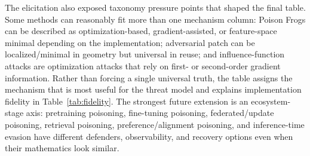 ﻿\documentclass[6p,10pt,times]{ieeeaccess}
\begin{document}
The elicitation also exposed taxonomy pressure points that shaped the final table. Some methods can reasonably fit more than one mechanism column: Poison Frogs can be described as optimization-based, gradient-assisted, or feature-space minimal depending on the implementation; adversarial patch can be localized/minimal in geometry but universal in reuse; and influence-function attacks are optimization attacks that rely on first- or second-order gradient information. Rather than forcing a single universal truth, the table assigns the mechanism that is most useful for the threat model and explains implementation fidelity in Table~\ref{tab:fidelity}. The strongest future extension is an ecosystem-stage axis: pretraining poisoning, fine-tuning poisoning, federated/update poisoning, retrieval poisoning, preference/alignment poisoning, and inference-time evasion have different defenders, observability, and recovery options even when their mathematics look similar.
\end{document}
